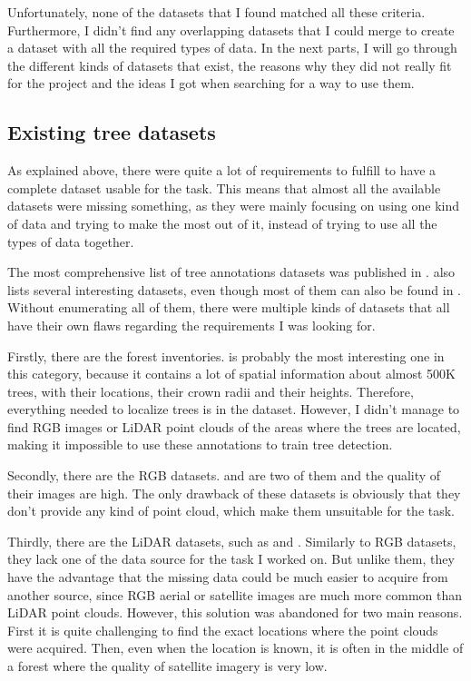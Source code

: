 \documentclass[
]{report}
\begin{document}
Unfortunately, none of the datasets that I found matched all these
criteria. Furthermore, I didn't find any overlapping datasets that I
could merge to create a dataset with all the required types of data. In
the next parts, I will go through the different kinds of datasets that
exist, the reasons why they did not really fit for the project and the
ideas I got when searching for a way to use them.

\subsection{Existing tree datasets}\label{existing-tree-datasets}

As explained above, there were quite a lot of requirements to fulfill to
have a complete dataset usable for the task. This means that almost all
the available datasets were missing something, as they were mainly
focusing on using one kind of data and trying to make the most out of
it, instead of trying to use all the types of data together.

The most comprehensive list of tree annotations datasets was published
in \textcite{OpenForest}. \textcite{FoMo-Bench} also lists several
interesting datasets, even though most of them can also be found in
\textcite{OpenForest}. Without enumerating all of them, there were
multiple kinds of datasets that all have their own flaws regarding the
requirements I was looking for.

Firstly, there are the forest inventories. \textcite{TALLO} is probably
the most interesting one in this category, because it contains a lot of
spatial information about almost 500K trees, with their locations, their
crown radii and their heights. Therefore, everything needed to localize
trees is in the dataset. However, I didn't manage to find RGB images or
LiDAR point clouds of the areas where the trees are located, making it
impossible to use these annotations to train tree detection.

Secondly, there are the RGB datasets. \textcite{ReforesTree} and
\textcite{MillionTrees} are two of them and the quality of their images
are high. The only drawback of these datasets is obviously that they
don't provide any kind of point cloud, which make them unsuitable for
the task.

Thirdly, there are the LiDAR datasets, such as \textcite{WildForest3D}
and \textcite{FOR-instance}. Similarly to RGB datasets, they lack one of
the data source for the task I worked on. But unlike them, they have the
advantage that the missing data could be much easier to acquire from
another source, since RGB aerial or satellite images are much more
common than LiDAR point clouds. However, this solution was abandoned for
two main reasons. First it is quite challenging to find the exact
locations where the point clouds were acquired. Then, even when the
location is known, it is often in the middle of a forest where the
quality of satellite imagery is very low.
\end{document}
